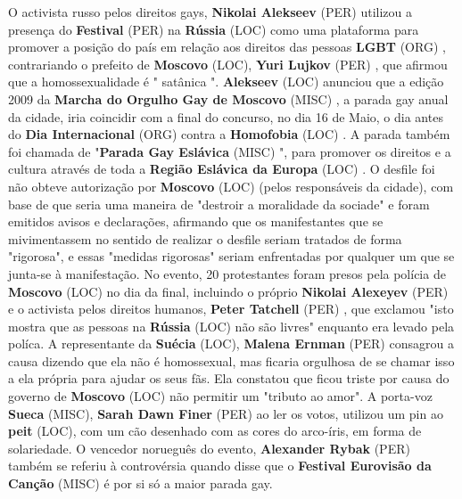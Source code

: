 \documentclass[12pt,a4paper]{article}
\begin{document}
O activista russo pelos direitos gays, \textbf{Nikolai Alekseev} (PER) utilizou a presença do \textbf{Festival} (PER) na \textbf{Rússia} (LOC) como uma plataforma para promover a posição do país em relação aos direitos das pessoas \textbf{LGBT} (ORG) , contrariando o prefeito de \textbf{Moscovo} (LOC), \textbf{Yuri Lujkov} (PER) , que afirmou que a homossexualidade é " satânica ". \textbf{Alekseev} (LOC) anunciou que a edição 2009 da \textbf{Marcha do Orgulho Gay de Moscovo} (MISC) , a parada gay anual da cidade, iria coincidir com a final do concurso, no dia 16 de Maio, o dia antes do \textbf{Dia Internacional} (ORG) contra a \textbf{Homofobia} (LOC) . A parada também foi chamada de "\textbf{Parada Gay Eslávica} (MISC) ", para promover os direitos e a cultura através de toda a \textbf{Região Eslávica da Europa} (LOC) . O desfile foi não obteve autorização por \textbf{Moscovo} (LOC) (pelos responsáveis da cidade), com base de que seria uma maneira de "destroir a moralidade da sociade" e foram emitidos avisos e declarações, afirmando que os manifestantes que se mivimentassem no sentido de realizar o desfile seriam tratados de forma "rigorosa", e essas "medidas rigorosas" seriam enfrentadas por qualquer um que se junta-se à manifestação. No evento, 20 protestantes foram presos pela polícia de \textbf{Moscovo} (LOC) no dia da final, incluindo o próprio \textbf{Nikolai Alexeyev} (PER) e o activista pelos direitos humanos, \textbf{Peter Tatchell} (PER) , que exclamou "isto mostra que as pessoas na \textbf{Rússia} (LOC) não são livres" enquanto era levado pela políca. A representante da \textbf{Suécia} (LOC), \textbf{Malena Ernman} (PER) consagrou a causa dizendo que ela não é homossexual, mas ficaria orgulhosa de se chamar isso a ela própria para ajudar os seus fãs. Ela constatou que ficou triste por causa do governo de \textbf{Moscovo} (LOC) não permitir um "tributo ao amor". A porta-voz \textbf{Sueca} (MISC), \textbf{Sarah Dawn Finer} (PER) ao ler os votos, utilizou um pin ao \textbf{peit} (LOC), com um cão desenhado com as cores do arco-íris, em forma de solariedade. O vencedor norueguês do evento, \textbf{Alexander Rybak} (PER) também se referiu à controvérsia quando disse que o \textbf{Festival Eurovisão da Canção} (MISC) é por si só a maior parada gay.
\end{document}
